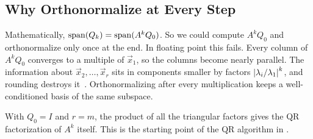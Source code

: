 \subsection{Why Orthonormalize at Every Step}

Mathematically, $\operatorname{span}(Q_k) = \operatorname{span}(A^kQ_0)$. So we could compute $A^kQ_0$ and orthonormalize only once at the end. In floating point this fails. Every column of $A^kQ_0$ converges to a multiple of $\vec{x}_1$, so the columns become nearly parallel. The information about $\vec{x}_2, \dots, \vec{x}_r$ sits in components smaller by factors $\left\lvert \lambda_i/\lambda_1 \right\rvert^k$, and rounding destroys it~\cite[Lecture~28]{TB}. Orthonormalizing after every multiplication keeps a well-conditioned basis of the same subspace.

With $Q_0 = I$ and $r = m$, the product of all the triangular factors gives the QR factorization of $A^k$ itself. This is the starting point of the QR algorithm in .
